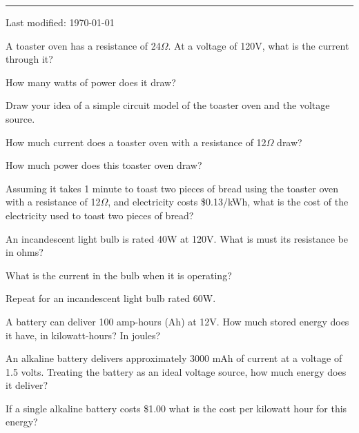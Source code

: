 \documentclass{article}
\begin{document}
\hrule
\vspace{10pt}

{\tiny Last modified: \today}





\subproblem
A toaster oven has a resistance of 24$\Omega$.  At a voltage of 120V,
what is the current through it?

\subproblem
How many watts of power does it draw?

\subproblem
Draw your idea of a simple circuit model of the toaster oven and the
voltage source.

\subproblem
How much current does a toaster oven with a resistance of
12$\Omega$ draw?

\subproblem
How much power does this toaster oven draw?

\subproblem
Assuming it takes 1 minute to toast two pieces of bread using the
toaster oven with a resistance of 12$\Omega$, and electricity costs
\$0.13/kWh, what is the cost of the electricity used to toast two
pieces of bread?




\subproblem
An incandescent light bulb is rated 40W at 120V.  What is must its
resistance be in ohms?

\subproblem
What is the current in the bulb when it is operating?

\subproblem
Repeat for an incandescent light bulb rated 60W.



\subproblem
A battery can deliver 100 amp-hours (Ah) at 12V.  How much stored
energy does it have, in kilowatt-hours?  In joules?

\subproblem
An alkaline battery delivers approximately 3000 mAh of current at a
voltage of 1.5 volts.  Treating the battery as an ideal voltage source,
how much energy does it deliver?


\subproblem
If a single alkaline battery costs \$1.00 what is the cost per kilowatt
hour for this energy?
\end{document}
